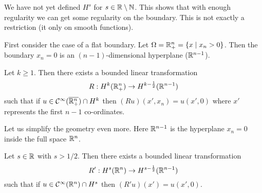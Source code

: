 \begin{rmk}
  \lv
  \begin{itm}
    \io We have not yet defined $H^s$ for $s\in\mathbb{R}\setminus\mathbb{N}$.
    \io This shows that with enough regularity we can get some regularity on the boundary.
    \io This is not exactly a restriction (it only on smooth functions).
  \end{itm}
\end{rmk}

First consider the case of a flat boundary.
Let $\Omega=\mathbb{R}_+^n=\{x \mid x_n>0\}$.
Then the boundary $x_n=0$ is an $(n-1)$-dimensional hyperplane ($\mathbb{R}^{n-1}$).

\begin{prop}\label{11:plane}
  Let $k\geq1$.
  Then there exists a bounded linear transformation
  \[ R: H^k(\mathbb{R}_+^n) \to H^{k-\frac12}(\mathbb{R}^{n-1}) \]
  such that if $u\in\mathcal{C}^\infty(\overline{\mathbb{R}_+^n})\cap H^k$ then $(Ru)(x',x_n)=u(x',0)$ where $x'$ represents the first $n-1$ co-ordinates.
\end{prop}

Let us simplify the geometry even more.
Here $\mathbb{R}^{n-1}$ is the hyperplane $x_n=0$ inside the full space $\mathbb{R}^n$.

\begin{prop}\label{11:interior}
  Let $s\in\mathbb{R}$ with $s>1/2$.
  Then there exists a bounded linear transformation
  \[ R': H^s(\mathbb{R}^n) \to H^{s-\frac12}(\mathbb{R}^{n-1}) \]
  such that if $u\in\mathcal{C}^\infty(\mathbb{R}^n)\cap H^s$ then $(R'u)(x')=u(x',0)$.
\end{prop}

